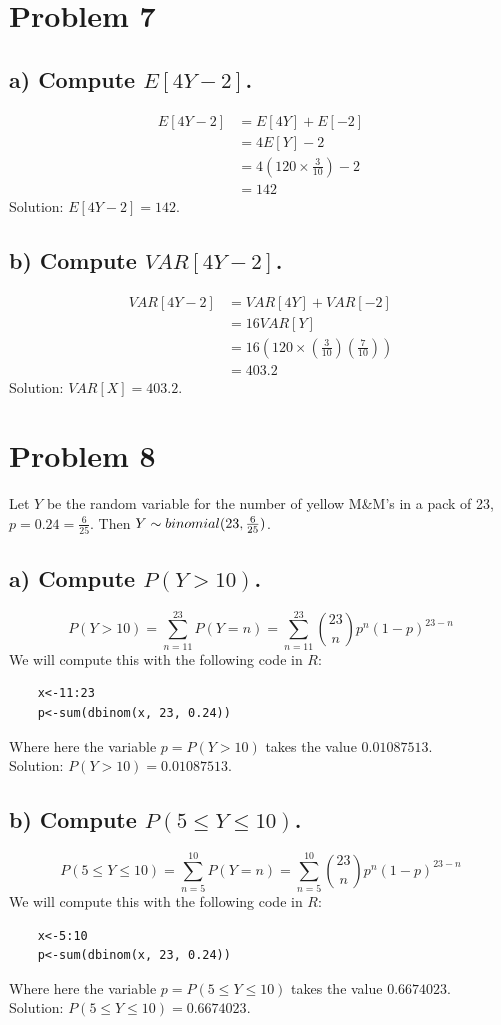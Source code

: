 \documentclass[11pt, letterpaper]{article}
\begin{document}
\section*{Problem 7}
\subsection*{a) Compute $E[4Y-2]$.}
\begin{align*}
    E[4Y-2]&=E[4Y]+E[-2]\\
    &=4E[Y]-2\\
    &=4\left(120\times \frac{3}{10}\right)-2\\
    &=142
\end{align*}
Solution: $E[4Y-2]=142$.
\subsection*{b) Compute $VAR[4Y-2]$.}
\begin{align*}
    VAR[4Y-2]&=VAR[4Y]+VAR[-2]\\
    &=16VAR[Y]\\
    &=16\left(120\times\left(\frac{3}{10}\right)\left(\frac{7}{10}\right)\right)\\
    &=403.2
\end{align*}
Solution: $VAR[X]=403.2$.

\section*{Problem 8}
Let $Y$ be the random variable for the number of yellow M\&M's in a pack of 23, $p=0.24=\frac{6}{25}$. Then $Y\sim binomial(23,\space \frac{6}{25})$.
\subsection*{a) \normalfont Compute $P(Y>10)$.}
\[P(Y>10)=\sum_{n=11}^{23}P(Y=n)=\sum_{n=11}^{23}{23\choose n}p^n(1-p)^{23-n}\]
We will compute this with the following code in $R$:
\begin{verbatim}
    x<-11:23
    p<-sum(dbinom(x, 23, 0.24))
\end{verbatim}
Where here the variable $p=P(Y>10)$ takes the value $0.01087513$.\\
Solution: $P(Y>10)=0.01087513$.
\subsection*{b) \normalfont Compute $P(5\leq Y\leq 10)$.}
\[P(5\leq Y\leq 10)=\sum_{n=5}^{10}P(Y=n)=\sum_{n=5}^{10}{23\choose n}p^n(1-p)^{23-n}\]
We will compute this with the following code in $R$:
\begin{verbatim}
    x<-5:10
    p<-sum(dbinom(x, 23, 0.24))
\end{verbatim}
Where here the variable $p=P(5\leq Y\leq 10)$ takes the value $0.6674023$.\\
Solution: $P(5\leq Y\leq 10)=0.6674023$.
\end{document}
